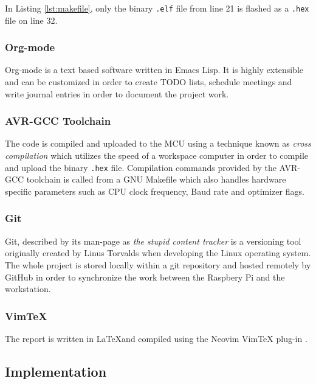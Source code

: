 

In Listing \ref{lst:makefile}, only the binary \verb|.elf| file from line 21 is flashed as a \verb|.hex| file on line 32. 

\subsubsection{Org-mode}%
\label{ssub:org_mode}
Org-mode is a text based software written in Emacs Lisp. It is highly extensible and can be customized in order to create TODO lists, schedule meetings and write journal entries in order to document the project work.

\subsubsection{AVR-GCC Toolchain}%
\label{ssub:avr_gcc_toolchain}
The code is compiled and uploaded to the MCU using a technique known as \textit{cross compilation} which utilizes the speed of a workspace computer in order to compile and upload the binary \verb|.hex| file. Compilation commands provided by the AVR-GCC toolchain \cite{GCCCompilersAVR} is called from a GNU Makefile which also handles hardware specific parameters such as CPU clock frequency, Baud rate and optimizer flags. 

\subsubsection{Git}%
\label{ssub:git}
Git, described by its man-page as \textit{the stupid content tracker} is a versioning tool originally created by Linus Torvalds \cite{git} when developing the Linux operating system. The whole project is stored locally within a git repository and hosted remotely by GitHub in order to synchronize the work between the Raspbery Pi and the workstation.
\subsubsection{VimTeX}%
\label{ssub:vimtex}
The report is written in \LaTeX and compiled using the Neovim VimTeX plug-in \cite{lervagVimTeX2022}.

\subsection{Implementation}%
\label{sub:implementation}

